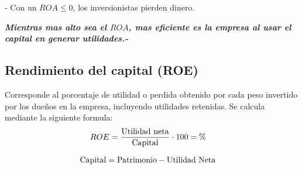 \documentclass{templateNote}
\begin{document}
\noindent - Con un $ROA \leq 0$, los inversionistas pierden dinero. 

\begin{tcolorbox}[colback=orange!5!white,colframe=orange!75!black,title=Observación]
    \textit{\textbf{Mientras mas alto sea el $ROA$, mas eficiente es la empresa al usar el capital en generar utilidades.-}}
\end{tcolorbox}

\subsection{Rendimiento del capital (ROE)}
\noindent Corresponde al porcentaje de utilidad o perdida obtenido por cada peso invertido por los dueños en la empresa, incluyendo utilidades retenidas. Se calcula mediante la siguiente formula:
\begin{align*}
    ROE &= \frac{\textnormal{Utilidad neta}}{\textnormal{Capital}} \cdot 100 = \%
\end{align*}

\begin{tcolorbox}[colback=purple!5!white,colframe=purple!75!black,title=Recordatorio]
    \begin{align*}
        \textnormal{Capital} &= \textnormal{Patrimonio} - \textnormal{Utilidad Neta}
    \end{align*}
\end{tcolorbox}
\end{document}
